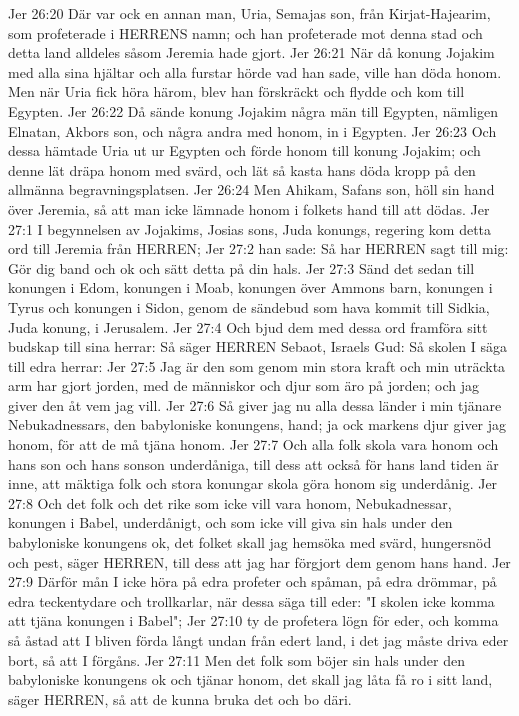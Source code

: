 Jer 26:20  Där var ock en annan man, Uria, Semajas son, från Kirjat-Hajearim, som profeterade i HERRENS namn; och han profeterade mot denna stad och detta land alldeles såsom Jeremia hade gjort.
Jer 26:21  När då konung Jojakim med alla sina hjältar och alla furstar hörde vad han sade, ville han döda honom. Men när Uria fick höra härom, blev han förskräckt och flydde och kom till Egypten.
Jer 26:22  Då sände konung Jojakim några män till Egypten, nämligen Elnatan, Akbors son, och några andra med honom, in i Egypten.
Jer 26:23  Och dessa hämtade Uria ut ur Egypten och förde honom till konung Jojakim; och denne lät dräpa honom med svärd, och lät så kasta hans döda kropp på den allmänna begravningsplatsen.
Jer 26:24  Men Ahikam, Safans son, höll sin hand över Jeremia, så att man icke lämnade honom i folkets hand till att dödas.
Jer 27:1  I begynnelsen av Jojakims, Josias sons, Juda konungs, regering kom detta ord till Jeremia från HERREN;
Jer 27:2  han sade: Så har HERREN sagt till mig: Gör dig band och ok och sätt detta på din hals.
Jer 27:3  Sänd det sedan till konungen i Edom, konungen i Moab, konungen över Ammons barn, konungen i Tyrus och konungen i Sidon, genom de sändebud som hava kommit till Sidkia, Juda konung, i Jerusalem.
Jer 27:4  Och bjud dem med dessa ord framföra sitt budskap till sina herrar: Så säger HERREN Sebaot, Israels Gud: Så skolen I säga till edra herrar:
Jer 27:5  Jag är den som genom min stora kraft och min uträckta arm har gjort jorden, med de människor och djur som äro på jorden; och jag giver den åt vem jag vill.
Jer 27:6  Så giver jag nu alla dessa länder i min tjänare Nebukadnessars, den babyloniske konungens, hand; ja ock markens djur giver jag honom, för att de må tjäna honom.
Jer 27:7  Och alla folk skola vara honom och hans son och hans sonson underdåniga, till dess att också för hans land tiden är inne, att mäktiga folk och stora konungar skola göra honom sig underdånig.
Jer 27:8  Och det folk och det rike som icke vill vara honom, Nebukadnessar, konungen i Babel, underdånigt, och som icke vill giva sin hals under den babyloniske konungens ok, det folket skall jag hemsöka med svärd, hungersnöd och pest, säger HERREN, till dess att jag har förgjort dem genom hans hand.
Jer 27:9  Därför mån I icke höra på edra profeter och spåman, på edra drömmar, på edra teckentydare och trollkarlar, när dessa säga till eder: "I skolen icke komma att tjäna konungen i Babel";
Jer 27:10  ty de profetera lögn för eder, och komma så åstad att I bliven förda långt undan från edert land, i det jag måste driva eder bort, så att I förgåns.
Jer 27:11  Men det folk som böjer sin hals under den babyloniske konungens ok och tjänar honom, det skall jag låta få ro i sitt land, säger HERREN, så att de kunna bruka det och bo däri.
